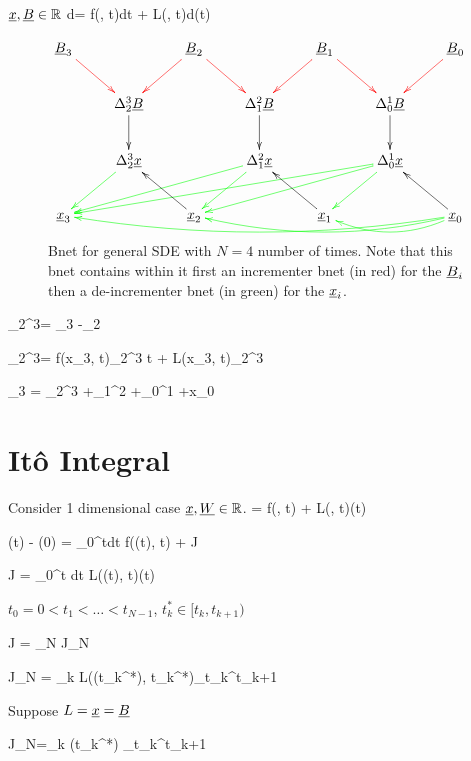 ${\underline{x}}, {\underline{B}}\in { \mathbb{R}}$
\beq
d\rvx= f(\rvx, t)dt + L(\rvx, t)d\rvB(t)
\eeq

\begin{figure}
$$
\xymatrix{
\rvB_3\ar@[red][dr] 
&& \rvB_2\ar@[red][dl]\ar@[red][dr]
&& \rvB_1\ar@[red][dl]\ar@[red][dr]
&& \rvB_0\ar@[red][dl]
\\
&\Delta^3_2\rvB \ar[d]
&&\Delta^2_1 \rvB \ar[d]
&&\Delta^1_0 \rvB \ar[d]
&
\\
&\Delta^3_2\rvx \ar@[green][dl] 
&&\Delta^2_1 \rvx \ar@[green][dlll]\ar@[green][dl]
&&\Delta^1_0\rvx \ar@[green][dlllll]\ar@[green][dlll]\ar@[green][dl]
&
\\
\rvx_3 
&& \rvx_2 \ar[lu] 
&& \rvx_1 \ar[lu]
&& \rvx_0\ar[lu]
\ar@[green]@[green]@/^1pc/[ll]
\ar@[green]@/^1pc/[llll]
\ar@[green]@/^1pc/[llllll]
}
$$
\caption{Bnet for general SDE with $N=4$ number of times. Note that this bnet
contains within it first an incrementer bnet
(in red) for the ${\underline{B}}_i$
then a de-incrementer bnet (in green)
for the ${\underline{x}}_i$.}
\label{fig-sde-3-nodes}
\end{figure}


\beq
\color{blue}
\Delta_{2}^{3}\rvB = 
\rvB_3 -\rvB_2
\eeq

\beq
\color{blue}
\Delta_{2}^{3}\rvx = 
f(x_3, t)\Delta_2^3 t +
L(x_3, t)\Delta_{2}^{3}\rvB
\eeq

\beq\color{blue}
\rvx_3 = \Delta_{2}^{3}\rvx
+\Delta_{1}^{2}\rvx
+\Delta_{0}^{1}\rvx
+x_0
\eeq



\section{It\^{o} Integral}

Consider 1 dimensional case ${\underline{x}}, {\underline{W}}\in { \mathbb{R}}$.
\beq
{}= f(\rvx, t) + L(\rvx, t)\rvW(t)
\eeq

\beq
\rvx(t) - \rvx(0) =
\int_{0}^{t}dt\; f(\rvx(t), t) + J
\eeq

\beq
J = \int_{0}^t dt\;
L(\rvx(t), t)\rvW(t)
\eeq

$t_0=0 < t_1 <\ldots <t_{N-1}$, $t_k^*\in [t_k, t_{k+1})$

\beq 
J = \lim_{N\rarrow \infty} J_N
\eeq


\beq 
J_N = 
\sum_k L(\rvx(t_k^*), t_k^*)\Delta_{t_k}^{t_{k+1}}\rvB
\eeq


Suppose $L={\underline{x}}={\underline{B}}$

\beq
J_N=\sum_k \rvB(t_k^*) \Delta_{t_k}^{t_{k+1}}\rvB
\eeq

